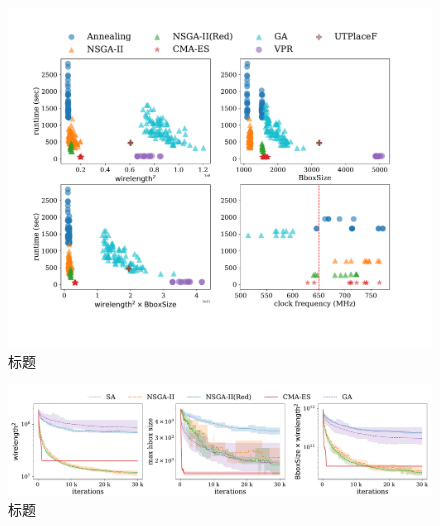 \begin{figure}[h]
	\centering
	\includegraphics[width=\textwidth]{figure/objective-runtime}
	\caption{标题} 
	\label{fig:objective}
\end{figure}


\begin{figure}[h]
	\centering
	\includegraphics[width=1.1\textwidth]{figure/convergence}
	\caption{标题} 
	\label{fig:converge}
\end{figure}

